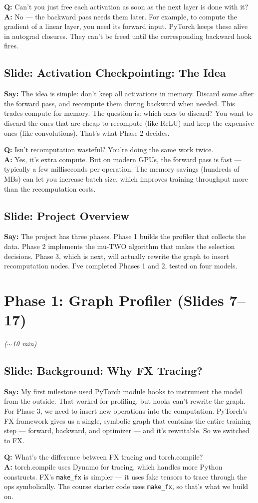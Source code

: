 \documentclass[11pt]{article}
\newcommand{\slide}[1]{\subsection*{Slide: #1}}
\newcommand{\say}[1]{\textbf{Say:} #1}
\newcommand{\qa}[2]{\textcolor{question}{\textbf{Q:} #1} \\ \textbf{A:} #2}
\newcommand{\timing}[1]{\hfill\textcolor{note}{\textit{(#1)}}}
\begin{document}
\qa{Can't you just free each activation as soon as the next layer is done with it?}{No --- the backward pass needs them later. For example, to compute the gradient of a linear layer, you need its forward input. PyTorch keeps these alive in autograd closures. They can't be freed until the corresponding backward hook fires.}

\slide{Activation Checkpointing: The Idea}
\say{The idea is simple: don't keep all activations in memory. Discard some after the forward pass, and recompute them during backward when needed. This trades compute for memory. The question is: which ones to discard? You want to discard the ones that are cheap to recompute (like ReLU) and keep the expensive ones (like convolutions). That's what Phase 2 decides.}

\qa{Isn't recomputation wasteful? You're doing the same work twice.}{Yes, it's extra compute. But on modern GPUs, the forward pass is fast --- typically a few milliseconds per operation. The memory savings (hundreds of MBs) can let you increase batch size, which improves training throughput more than the recomputation costs.}

\slide{Project Overview}
\say{The project has three phases. Phase 1 builds the profiler that collects the data. Phase 2 implements the mu-TWO algorithm that makes the selection decisions. Phase 3, which is next, will actually rewrite the graph to insert recomputation nodes. I've completed Phases 1 and 2, tested on four models.}


\section{Phase 1: Graph Profiler (Slides 7--17)} \timing{$\sim$10 min}

\slide{Background: Why FX Tracing?}
\say{My first milestone used PyTorch module hooks to instrument the model from the outside. That worked for profiling, but hooks can't rewrite the graph. For Phase 3, we need to insert new operations into the computation. PyTorch's FX framework gives us a single, symbolic graph that contains the entire training step --- forward, backward, and optimizer --- and it's rewritable. So we switched to FX.}

\qa{What's the difference between FX tracing and torch.compile?}{torch.compile uses Dynamo for tracing, which handles more Python constructs. FX's \texttt{make\_fx} is simpler --- it uses fake tensors to trace through the ops symbolically. The course starter code uses \texttt{make\_fx}, so that's what we build on.}
\end{document}
